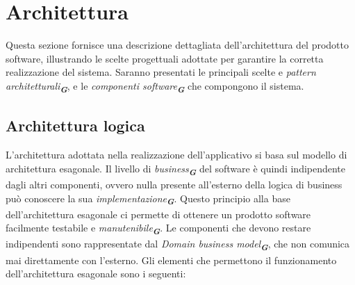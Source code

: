 
\section{Architettura}
\label{sec:architettura}

Questa sezione fornisce una descrizione dettagliata dell'architettura del prodotto software, illustrando le scelte progettuali adottate per garantire la corretta realizzazione del sistema. Saranno presentati le principali scelte e \emph{pattern architetturali}\textsubscript{\textbf{\textit{G}}}, e le \emph{componenti software}\textsubscript{\textbf{\textit{G}}} che compongono il sistema.

\subsection{Architettura logica}
L’architettura adottata nella realizzazione dell’applicativo si basa sul modello di architettura esagonale. Il livello di \emph{business}\textsubscript{\textbf{\textit{G}}} del software è quindi indipendente dagli altri componenti, ovvero nulla presente all’esterno della logica di business può conoscere la sua \emph{implementazione}\textsubscript{\textbf{\textit{G}}}. Questo principio alla base dell’architettura esagonale ci permette di ottenere un prodotto software facilmente testabile e \emph{manutenibile}\textsubscript{\textbf{\textit{G}}}. Le componenti che devono restare indipendenti sono rappresentate dal \emph{Domain business model}\textsubscript{\textbf{\textit{G}}}, che non comunica mai direttamente con l’esterno.
Gli elementi che permettono il funzionamento dell’architettura esagonale sono i seguenti:
